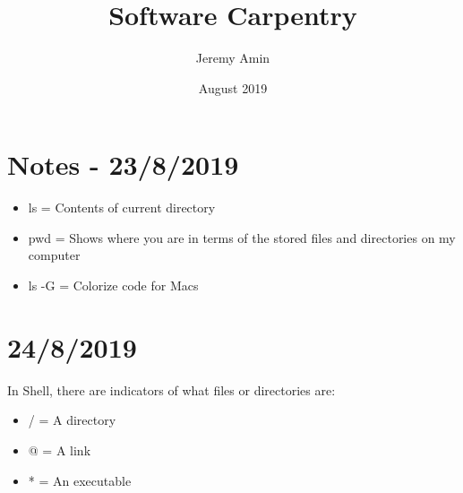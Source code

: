 \documentclass{article}
\title{Software Carpentry}
\author{Jeremy Amin}
\date{August 2019}
\begin{document}
\maketitle

\section{Notes - 23/8/2019}

\begin{itemize}
    \item ls = Contents of current directory
    \item pwd = Shows where you are in terms of the stored files and directories on my computer
    \item ls -G = Colorize code for Macs
\end{itemize}

\section{24/8/2019}
In Shell, there are indicators of what files or directories are:
\begin{itemize}
\item / = A directory
\item @ = A link
\item * = An executable
\end{itemize}
\end{document}
